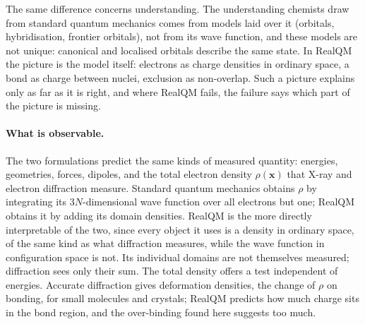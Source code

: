 \documentclass[11pt]{article}
\begin{document}
The same difference concerns understanding. The understanding chemists draw from standard quantum mechanics comes
from models laid over it (orbitals, hybridisation, frontier orbitals), not from its wave function, and these models
are not unique: canonical and localised orbitals describe the same state. In RealQM the picture is the model itself:
electrons as charge densities in ordinary space, a bond as charge between nuclei, exclusion as non-overlap. Such a
picture explains only as far as it is right, and where RealQM fails, the failure says which part of the picture is
missing.

\paragraph{What is observable.} The two formulations predict the same kinds of measured quantity: energies,
geometries, forces, dipoles, and the total electron density $\rho(\mathbf{x})$ that X-ray and electron diffraction
measure. Standard quantum mechanics obtains $\rho$ by integrating its $3N$-dimensional wave function over all
electrons but one; RealQM obtains it by adding its domain densities. RealQM is the more directly interpretable of
the two, since every object it uses is a density in ordinary space, of the same kind as what diffraction
measures, while the wave function in configuration space is not. Its individual domains are not themselves
measured; diffraction sees only their sum. The total density offers a test independent of energies.
Accurate diffraction gives deformation densities, the change of $\rho$ on bonding, for small molecules and
crystals; RealQM predicts how much charge sits in the bond region, and the over-binding found here suggests too
much.
\end{document}
